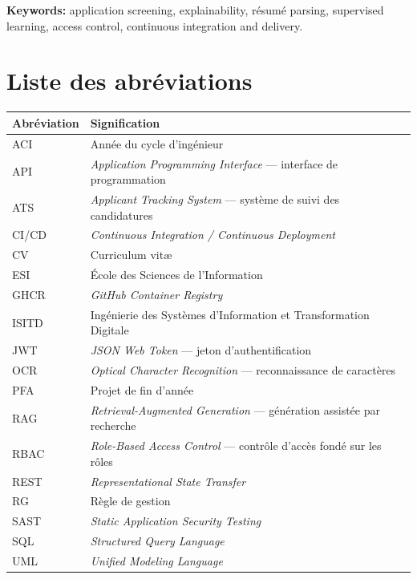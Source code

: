 \documentclass[12pt,a4paper]{report}
\begin{document}
\vspace{0.3cm}
\noindent\textbf{Keywords:} application screening, explainability, résumé
parsing, supervised learning, access control, continuous integration and
delivery.
\endgroup

\tableofcontents
{}

\chapter*{Liste des abréviations}

\begin{longtable}{@{}p{3.2cm}p{10.5cm}@{}}
\toprule
\textbf{Abréviation} & \textbf{Signification} \\
\midrule
\endhead
ACI & Année du cycle d'ingénieur \\
API & \emph{Application Programming Interface} --- interface de programmation \\
ATS & \emph{Applicant Tracking System} --- système de suivi des candidatures \\
CI/CD & \emph{Continuous Integration / Continuous Deployment} \\
CV & Curriculum vit\ae{} \\
ESI & École des Sciences de l'Information \\
GHCR & \emph{GitHub Container Registry} \\
ISITD & Ingénierie des Systèmes d'Information et Transformation Digitale \\
JWT & \emph{JSON Web Token} --- jeton d'authentification \\
OCR & \emph{Optical Character Recognition} --- reconnaissance de caractères \\
PFA & Projet de fin d'année \\
RAG & \emph{Retrieval-Augmented Generation} --- génération assistée par recherche \\
RBAC & \emph{Role-Based Access Control} --- contrôle d'accès fondé sur les rôles \\
REST & \emph{Representational State Transfer} \\
RG & Règle de gestion \\
SAST & \emph{Static Application Security Testing} \\
SQL & \emph{Structured Query Language} \\
UML & \emph{Unified Modeling Language} \\
\bottomrule
\end{longtable}
\end{document}
